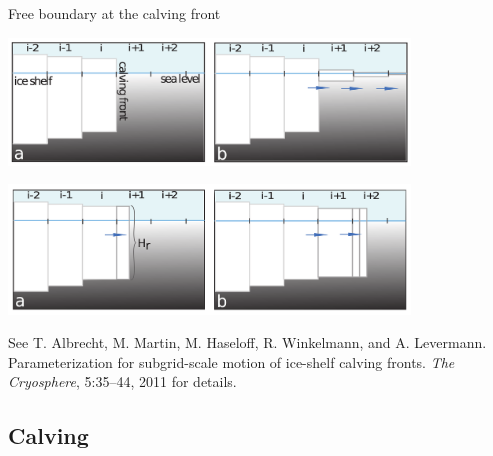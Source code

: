 \documentclass[hide notes,intlimits]{beamer}
\begin{document}
\begin{frame}{Free boundary at the calving front}
  \begin{center}
    \includegraphics[width=0.8\textwidth]{albrecht-martin-figure-1}

    \includegraphics[width=0.8\textwidth]{albrecht-martin-figure-2}
  \end{center}

  See T. Albrecht, M. Martin, M. Haseloff, R. Winkelmann, and A.
  Levermann. Parameterization for subgrid-scale motion of ice-shelf
  calving fronts. \emph{The Cryosphere}, 5:35–44, 2011 for details.
\end{frame}

\subsection{Calving}
\label{sec:calving}
\end{document}

